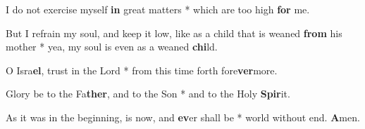 \begin{multicols}{2}
	I do not exercise myself \textbf{in} great matters * which are too high \textbf{for} me.
	
	But I refrain my soul, and keep it low, like as a child that is weaned \textbf{from} his mother * yea, my soul is even as a weaned \textbf{chi}ld.
	
	O Isra\textbf{el}, trust in the Lord * from this time forth fore\textbf{ver}more.
	
	Glory be to the Fa\textbf{ther}, and to the Son * and to the Holy \textbf{Spir}it.
	
	As it was in the beginning, is now, and \textbf{ev}er shall be * world without end. \textbf{A}men.
\end{multicols}